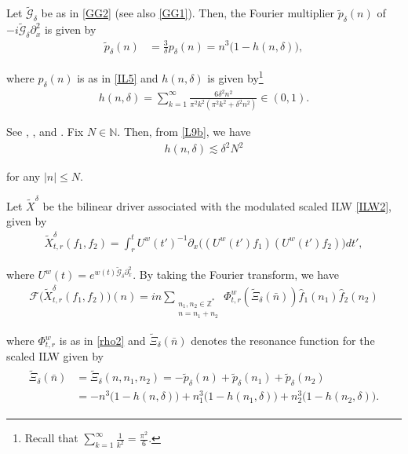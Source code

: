 \documentclass[letterpaper, 11pt,  reqno]{amsart}
\newcommand{\1}{\hspace{0.5mm}\text{I}\hspace{0.5mm}}
\newcommand{\noi}{\noindent}
\newcommand{\Z}{\mathbb{Z}}
\newcommand{\F}{\mathcal{F}}
\newcommand{\dl}{\delta}
\newcommand{\ft}{\widehat}
\newcommand{\wt}{\widetilde}
\newcommand{\dx}{\partial_x}
\newcommand{\Gd}{\wt{\mathcal{G}}_\dl}
\newcommand{\les}{\lesssim}
\newcommand{\N}{\mathbb{N}}
\newcommand{\uw}{U^w}
\newcommand{\sub}{\substack}
\numberwithin{equation}{section}
\numberwithin{theorem}{section}
\begin{document}
Let $\Gd$ be as in \eqref{GG2} (see also \eqref{GG1}).
Then, 
 the Fourier multiplier $\wt p_\dl(n)$ of $-i\Gd \dx^2$ is given by 
 \begin{align}
\wt p_\dl(n)
&  =   \frac 3 \dl p_\dl(n) =  n^3 \big(1- h(n,\dl)  \big), 
\label{L9}
\end{align}


\noi
where $p_\dl(n)$ is as in \eqref{IL5} and $h(n,\dl)$ is given by\footnote{Recall that  
$ \sum_{k=1}^{\infty}   \frac1 {k^2} = \frac{\pi^2}6$.}
\begin{align}
h(n,\dl) = \sum_{k=1}^{\infty}   \frac{6\dl^2n^2}{\pi^2k^2 (\pi^2k^2 +\dl^2n^2)}
\in (0, 1).
\label{L9b}
\end{align}

\noi
See \cite[Lemma 8.2.1]{ABFS}, 
\cite[(the proof of) Lemma 2.3]{LOZ}, 
and \cite[Lemma 2.3]{CLO}.
Fix $N \in \N$.
Then, 
from \eqref{L9b}, we have 
\begin{align}
h(n,\dl)  \les  \dl^2 N^2
\label{L9a}
\end{align}


\noi
for any $|n| \le N$.


Let $\wt X^\dl$ be the bilinear driver associated with
the modulated scaled ILW \eqref{ILW2},  given by 
\begin{align}
\wt X^\dl_{t,r}( f _1, f _2)
=\int_r^t  \uw  (t')^{-1}
\dx \big( (\uw (t')   f _1 )(\uw (t')  f_2) \big)dt',
\label{L9x}
\end{align}


\noi
where  $\uw (t)=e^{ w(t)\Gd \dx^2}$.
By taking the Fourier transform, we have 
\begin{align*}
\F\big( \wt X^\dl_{t,r}  ( f _1, f _2) \big)(n)  =
in  \sum_{ \sub {n_1, n_2 \in \Z^*\\ n = n_1+n_2}}
 \Phi_{t,r}^{w}(\wt \Xi_\dl (\bar n))\ft  f_1 ( n_1 )  \ft   f_2 (n_2)
\end{align*}


\noi
where $\Phi_{t,r}^w$ is as in  \eqref{rho2}
and 
$\wt \Xi_\dl (\bar n)$ denotes the resonance function for the scaled ILW given by 
\begin{align}
\begin{split}
\wt \Xi_\dl (\bar n)
& = \wt \Xi_\dl(n,n_1,n_2) = - \wt p_\dl(n)  +  \wt  p_\dl(n_1) +  \wt p_\dl(n_2)\\
& = - n^3 \big(1- h(n,\dl)  \big)
+ n_1^3 \big(1- h(n_1,\dl)  \big)
+ n_2^3 \big(1- h(n_2,\dl)  \big).
\end{split}
\label{L11}
\end{align}
\end{document}
